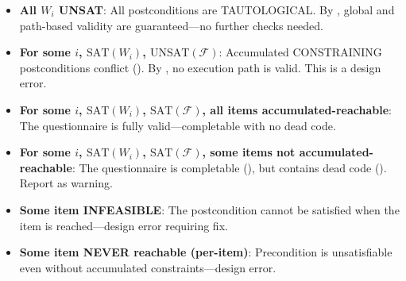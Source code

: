\begin{itemize}
    \item \textbf{All $W_i$ UNSAT}: All postconditions are TAUTOLOGICAL. By , global and path-based validity are guaranteed—no further checks needed.

    \item \textbf{For some $i$, $\mathrm{SAT}(W_i)$, $\mathrm{UNSAT}(\mathcal{F})$}: Accumulated CONSTRAINING postconditions conflict (). By , no execution path is valid. This is a design error.

    \item \textbf{For some $i$, $\mathrm{SAT}(W_i)$, $\mathrm{SAT}(\mathcal{F})$, all items accumulated-reachable}: The questionnaire is fully valid—completable with no dead code.

    \item \textbf{For some $i$, $\mathrm{SAT}(W_i)$, $\mathrm{SAT}(\mathcal{F})$, some items not accumulated-reachable}: The questionnaire is completable (), but contains dead code (). Report as warning.

    \item \textbf{Some item INFEASIBLE}: The postcondition cannot be satisfied when the item is reached—design error requiring fix.

    \item \textbf{Some item NEVER reachable (per-item)}: Precondition is unsatisfiable even without accumulated constraints—design error.
\end{itemize}

